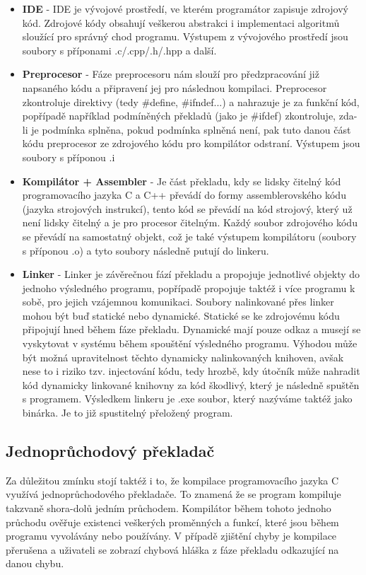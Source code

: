 \documentclass[twoside,a4paper]{article} %
\begin{document}
\begin{itemize}
    \item \textbf{IDE} - IDE je vývojové prostředí, ve kterém programátor zapisuje zdrojový kód. Zdrojové kódy obsahují veškerou abstrakci i implementaci algoritmů sloužící pro správný chod programu. Výstupem z vývojového prostředí jsou soubory s příponami .c/.cpp/.h/.hpp a další.
    \item \textbf{Preprocesor} - Fáze preprocesoru nám slouží pro předzpracování již napsaného kódu a připravení jej pro následnou kompilaci. Preprocesor zkontroluje direktivy (tedy \#define, \#ifndef...) a nahrazuje je za funkční kód, popřípadě například podmíněných překladů (jako je \#ifdef) zkontroluje, zda-li je podmínka splněna, pokud podmínka splněná není, pak tuto danou část kódu preprocesor ze zdrojového kódu pro kompilátor odstraní. Výstupem jsou soubory s příponou .i
    \item \textbf{Kompilátor + Assembler} - Je část překladu, kdy se lidsky čitelný kód programovacího jazyka C a C++ převádí do formy assemblerovského kódu (jazyka strojových instrukcí), tento kód se převádí na kód strojový, který už není lidsky čitelný a je pro procesor čitelným. Každý soubor zdrojového kódu se převádí na samostatný objekt, což je také výstupem kompilátoru (soubory s příponou .o) a tyto soubory následně putují do linkeru.
    \item \textbf{Linker} - Linker je závěrečnou fází překladu a propojuje jednotlivé objekty do jednoho výsledného programu, popřípadě propojuje taktéž i více programu k sobě, pro jejich vzájemnou komunikaci. Soubory nalinkované přes linker mohou být buď statické nebo dynamické. Statické se ke zdrojovému kódu připojují hned během fáze překladu. Dynamické mají pouze odkaz a musejí se vyskytovat v systému během spouštění výsledného programu. Výhodou může být možná upravitelnost těchto dynamicky nalinkovaných knihoven, avšak nese to i riziko tzv. injectování kódu, tedy hrozbě, kdy útočník může nahradit kód dynamicky linkované knihovny za kód škodlivý, který je následně spuštěn s programem. Výsledkem linkeru je .exe soubor, který nazýváme taktéž jako binárka. Je to již spustitelný přeložený program.
\end{itemize}


\subsection{Jednoprůchodový překladač}
Za důležitou zmínku stojí taktéž i to, že kompilace programovacího jazyka C využívá jednoprůchodového překladače. To znamená že se program kompiluje takzvaně shora-dolů jedním průchodem. Kompilátor během tohoto jednoho průchodu ověřuje existenci veškerých proměnných a funkcí, které jsou během programu vyvolávány nebo používány. V případě zjištění chyby je kompilace přerušena a uživateli se zobrazí chybová hláška z fáze překladu odkazující na danou chybu. 
\end{document}
